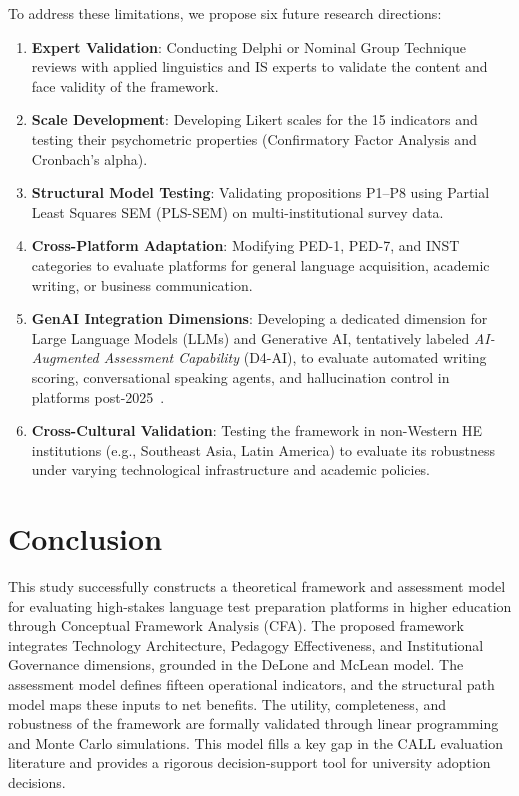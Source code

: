 \documentclass[11pt,a4paper]{article}
\begin{document}
To address these limitations, we propose six future research directions:
\begin{enumerate}
  \item \textbf{Expert Validation}: Conducting Delphi or Nominal Group Technique reviews with applied linguistics and IS experts to validate the content and face validity of the framework.
  \item \textbf{Scale Development}: Developing Likert scales for the 15 indicators and testing their psychometric properties (Confirmatory Factor Analysis and Cronbach's alpha).
  \item \textbf{Structural Model Testing}: Validating propositions P1--P8 using Partial Least Squares SEM (PLS-SEM) on multi-institutional survey data.
  \item \textbf{Cross-Platform Adaptation}: Modifying PED-1, PED-7, and INST categories to evaluate platforms for general language acquisition, academic writing, or business communication.
  \item \textbf{GenAI Integration Dimensions}: Developing a dedicated dimension for Large Language Models (LLMs) and Generative AI, tentatively labeled \textit{AI-Augmented Assessment Capability} (D4-AI), to evaluate automated writing scoring, conversational speaking agents, and hallucination control in platforms post-2025~\cite{b37}\cite{b38}\cite{b39}\cite{b40}.
  \item \textbf{Cross-Cultural Validation}: Testing the framework in non-Western HE institutions (e.g., Southeast Asia, Latin America) to evaluate its robustness under varying technological infrastructure and academic policies.
\end{enumerate}


\section{Conclusion}
\label{sec:conclusion}

This study successfully constructs a theoretical framework and assessment model for evaluating high-stakes language test preparation platforms in higher education through Conceptual Framework Analysis (CFA). The proposed framework integrates Technology Architecture, Pedagogy Effectiveness, and Institutional Governance dimensions, grounded in the DeLone and McLean model. The assessment model defines fifteen operational indicators, and the structural path model maps these inputs to net benefits. The utility, completeness, and robustness of the framework are formally validated through linear programming and Monte Carlo simulations. This model fills a key gap in the CALL evaluation literature and provides a rigorous decision-support tool for university adoption decisions.
\end{document}
